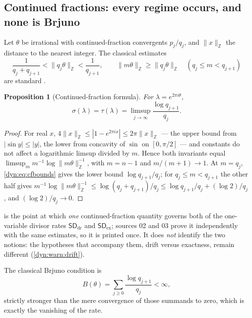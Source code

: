 \documentclass[11pt,letterpaper]{article}
\newtheorem{proposition}[proposition]{Proposition}
\theoremstyle{definition}
\theoremstyle{remark}
\newcommand{\Z}{\mathbb Z}
\newcommand{\sddr}{\mathsf{SD}_{\mathrm{dr}}}
\newcommand{\sdex}{\mathsf{SD}_{\mathrm{ex}}}
\numberwithin{equation}{section}
\begin{document}
\subsection{Continued fractions: every regime occurs, and none is Brjuno}
\label{dyn:subsec:arithmetic}

Let $\theta$ be irrational with continued-fraction convergents $p_j/q_j$,
and $\|x\|_{\Z}$ the distance to the nearest integer. The classical
estimates
\begin{equation}\label{dyn:eq:cfbounds}
 \frac1{q_j+q_{j+1}}<\|q_j\theta\|_{\Z}<\frac1{q_{j+1}},
 \qquad
 \|m\theta\|_{\Z}\ge\|q_j\theta\|_{\Z}\quad(q_j\le m<q_{j+1})
\end{equation}
are standard \cite{Marmi,CarlettiMarmi}.

\begin{proposition}[Continued-fraction formula]\label{dyn:prop:cf}
For $\lambda=e^{2\pi i\theta}$,
\begin{equation}\label{dyn:eq:tau-cf}
 \sigma(\lambda)=\tau(\lambda)
 =\limsup_{j\to\infty}\frac{\log q_{j+1}}{q_j}.
\end{equation}
\end{proposition}
\begin{proof}
For real $x$, $4\|x\|_{\Z}\le|1-e^{2\pi ix}|\le2\pi\|x\|_{\Z}$ --- the
upper bound from $|\sin y|\le|y|$, the lower from concavity of $\sin$ on
$[0,\pi/2]$ --- and constants do not affect a logarithmic limsup divided by
$m$. Hence both invariants equal
$\limsup_m m^{-1}\log\|m\theta\|_{\Z}^{-1}$, with $m=n-1$ and
$m/(m+1)\to1$. At $m=q_j$, \eqref{dyn:eq:cfbounds} gives the lower bound
$\log q_{j+1}/q_j$; for $q_j\le m<q_{j+1}$ the other half gives
$m^{-1}\log\|m\theta\|_{\Z}^{-1}\le\log(q_j+q_{j+1})/q_j
\le\log q_{j+1}/q_j+(\log2)/q_j$, and $(\log2)/q_j\to0$.
\end{proof}

 is the point at which \emph{one} continued-fraction
quantity governs both of the one-variable divisor rates $\sddr$ and
$\sdex$; sources 02 and 03 prove it independently with the same estimates,
so it is printed once. It does \emph{not} identify the two notions: the
hypotheses that accompany them, drift versus exactness, remain different
(\cref{dyn:warn:drift}).

The classical Brjuno condition is
\begin{equation}\label{dyn:eq:brjuno}
 B(\theta)=\sum_{j\ge0}\frac{\log q_{j+1}}{q_j}<\infty ,
\end{equation}
strictly stronger than the mere convergence of those summands to zero,
which is exactly the vanishing of the rate.
\end{document}
